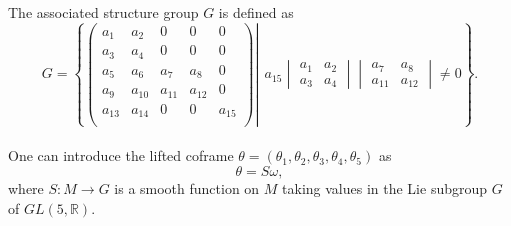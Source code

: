 \documentclass[12pt]{article}
\begin{document}
The associated structure group $G$ is defined as
\begin{equation}\label{G}
 G=\left\{\left.\begin{pmatrix}
a_1&a_2&0&0&0\\
a_3&a_4&0&0&0\\
a_5&a_6&a_7&a_8&0\\
a_9&a_{10}&a_{11}&a_{12}&0\\
a_{13}&a_{14}&0&0&a_{15}\\
\end{pmatrix}\right|~~ a_{15}
\begin{vmatrix}
a_1&a_2\\
a_3&a_4
\end{vmatrix}
\begin{vmatrix}
a_7&a_8\\
a_{11}&a_{12}
\end{vmatrix}\neq0\right\}.
\end{equation}\\
One can introduce the lifted coframe $\theta=(\theta_1, \theta_2, \theta_3,\theta_4, \theta_5)$ as 
\begin{equation}\label{S3}
\theta=S\omega,
\end{equation}
where $S:M\rightarrow G$ is a smooth function on $M$ taking values in the Lie subgroup $G$ of $GL(5,\mathbb{R})$.\\
\end{document}
